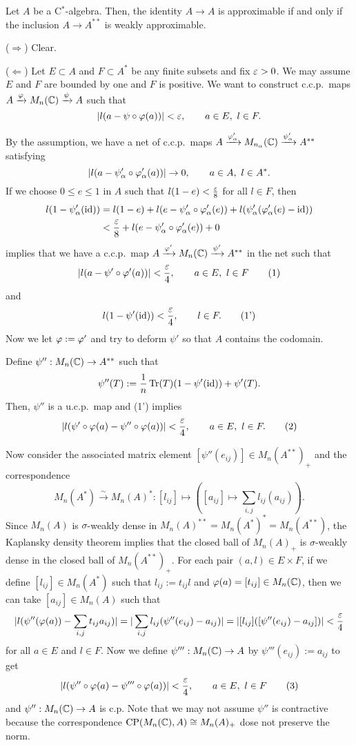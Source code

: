 \documentclass{../../../small}
\begin{document}
\begin{thm}
Let $A$ be a C$^*$-algebra.
Then, the identity $A\to A$ is approximable if and only if the inclusion $A\to A^{**}$ is weakly approximable.
\end{thm}
\begin{pf}
($\Rightarrow$)
Clear.

($\Leftarrow$)
Let $E\subset A$ and $F\subset A^*$ be any finite subsets and fix $\varepsilon>0$.
We may assume $E$ and $F$ are bounded by one and $F$ is positive.
We want to construct c.c.p.~maps $A\xrightarrow{\varphi}M_n(\mathbb{C})\xrightarrow{\psi} A$ such that
\[|l(a-\psi\circ\varphi(a))|<\varepsilon,\qquad a\in E,\ l\in F.\]

By the assumption, we have a net of c.c.p.~maps $A\xrightarrow{\varphi'_\alpha}M_{n_\alpha}(\mathbb{C})\xrightarrow{\psi'_\alpha} A^{**}$ satisfying
\[|l(a-\psi'_\alpha\circ\varphi'_\alpha(a))|\to0,\qquad a\in A,\ l\in A^*.\]
If we choose $0\le e\le1$ in $A$ such that $l(1-e)<\frac{\varepsilon}8$ for all $l\in F$, then
\begin{align*}
l(1-\psi'_\alpha(\operatorname{id}))
&=l(1-e)+l(e-\psi'_\alpha\circ\varphi'_\alpha(e))+l(\psi'_\alpha(\varphi'_\alpha(e)-\operatorname{id}))\\
&<\frac{\varepsilon}8+l(e-\psi'_\alpha\circ\varphi'_\alpha(e))+0
\end{align*}
implies that we have a c.c.p.~map $A\xrightarrow{\varphi'}M_n(\mathbb{C})\xrightarrow{\psi'} A^{**}$ in the net such that
\[|l(a-\psi'\circ\varphi'(a))|<\frac{\varepsilon}4,\qquad a\in E,\ l\in F\tag{1}\]
and
\[l(1-\psi'(\operatorname{id}))<\frac{\varepsilon}4,\qquad l\in F.\tag{1'}\]
Now we let $\varphi:=\varphi'$ and try to deform $\psi'$ so that $A$ contains the codomain.

Define $\psi'':M_n(\mathbb{C})\to A^{**}$ such that
\[\psi''(T):=\frac1n\operatorname{Tr}(T)(1-\psi'(\operatorname{id}))+\psi'(T).\]
Then, $\psi''$ is a u.c.p.~map and (1') implies
\[|l(\psi'\circ\varphi(a)-\psi''\circ\varphi(a))|<\frac{\varepsilon}4,\qquad a\in E,\ l\in F.\tag{2}\]

Now consider the associated matrix element $[\psi''(e_{ij})]\in M_n(A^{**})_+$ and the correspondence
\[M_n(A^*)\xrightarrow{\sim}M_n(A)^*:[l_{ij}]\mapsto([a_{ij}]\mapsto\sum_{i,j}l_{ij}(a_{ij})).\]
Since $M_n(A)$ is $\sigma$-weakly dense in $M_n(A)^{**}=M_n(A^*)^*=M_n(A^{**})$, the Kaplansky density theorem implies that the closed ball of $M_n(A)_+$ is $\sigma$-weakly dense in the closed ball of $M_n(A^{**})_+$.
For each pair $(a,l)\in E\times F$, if we define $[l_{ij}]\in M_n(A^*)$ such that $l_{ij}:=t_{ij}l$ and $\varphi(a)=[t_{ij}]\in M_n(\mathbb{C})$, then we can take $[a_{ij}]\in M_n(A)$ such that
\[|l(\psi''(\varphi(a))-\sum_{i,j}t_{ij}a_{ij})|=|\sum_{i,j}l_{ij}(\psi''(e_{ij})-a_{ij})|=|[l_{ij}]([\psi''(e_{ij})-a_{ij}])|<\frac{\varepsilon}4\]
for all $a\in E$ and $l\in F$.
Now we define $\psi''':M_n(\mathbb{C})\to A$ by $\psi'''(e_{ij}):=a_{ij}$ to get
\[|l(\psi''\circ\varphi(a)-\psi'''\circ\varphi(a))|<\frac{\varepsilon}4,\qquad a\in E,\ l\in F\tag{3}\]
and $\psi'':M_n(\mathbb{C})\to A$ is c.p.
Note that we may not assume $\psi''$ is contractive because the correspondence $\mathrm{CP}(M_n(\mathbb{C}), A)\cong M_n(A)_+$ dose not preserve the norm.


\end{pf}
\end{document}
